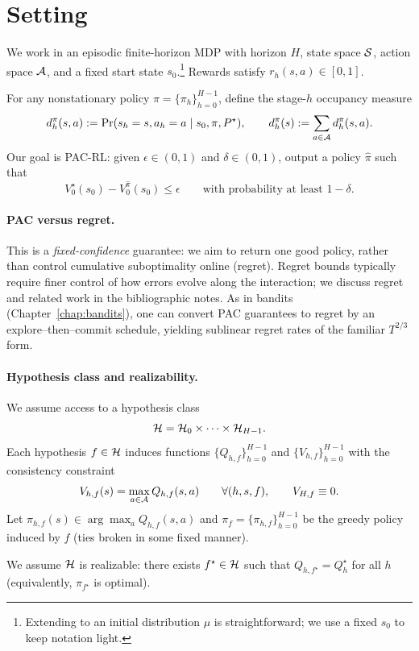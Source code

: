 \section{Setting}
\label{sec:br_setting}

We work in an episodic finite-horizon MDP with horizon $H$, state space $\mathcal{S}$, action space $\mathcal{A}$,
and a fixed start state $s_0$.\footnote{Extending to an initial distribution $\mu$ is straightforward; we
use a fixed $s_0$ to keep notation light.}
Rewards satisfy $r_h(s,a)\in[0,1]$.

For any nonstationary policy $\pi=\{\pi_h\}_{h=0}^{H-1}$, define the stage-$h$ occupancy measure
\[
d_h^\pi(s,a) := \Pr(s_h=s,a_h=a \mid s_0,\pi,P^\star),
\qquad
d_h^\pi(s) := \sum_{a\in\mathcal{A}} d_h^\pi(s,a).
\]
Our goal is PAC-RL: given $\epsilon\in(0,1)$ and $\delta\in(0,1)$, output a policy $\hat\pi$ such that
\[
V_0^\star(s_0) - V_0^{\hat\pi}(s_0)\le \epsilon
\qquad\text{with probability at least } 1-\delta.
\]

\paragraph{PAC versus regret.}
This is a \emph{fixed-confidence} guarantee: we aim to return one good policy, rather than control
cumulative suboptimality online (regret).  Regret bounds typically require finer control of how
errors evolve along the interaction; we discuss regret and related work in the bibliographic notes.
As in bandits (Chapter~\ref{chap:bandits}), one can convert PAC guarantees to regret by an
explore--then--commit schedule, yielding sublinear regret rates of the familiar $T^{2/3}$ form.

\paragraph{Hypothesis class and realizability.}
We assume access to a hypothesis class
\[
\mathcal{H} = \mathcal{H}_0 \times \cdots \times \mathcal{H}_{H-1}.
\]
Each hypothesis $f\in\mathcal{H}$ induces functions $\{Q_{h,f}\}_{h=0}^{H-1}$ and $\{V_{h,f}\}_{h=0}^{H-1}$
with the consistency constraint
\[
V_{h,f}(s)=\max_{a\in\mathcal{A}} Q_{h,f}(s,a) \qquad \forall (h,s,f),
\qquad V_{H,f}\equiv 0.
\]
Let $\pi_{h,f}(s)\in\arg\max_a Q_{h,f}(s,a)$ and $\pi_f=\{\pi_{h,f}\}_{h=0}^{H-1}$ be the greedy policy
induced by $f$ (ties broken in some fixed manner).

We assume $\mathcal{H}$ is realizable: there exists $f^\star\in\mathcal{H}$ such that $Q_{h,f^\star}=Q_h^\star$
for all $h$ (equivalently, $\pi_{f^\star}$ is optimal).

